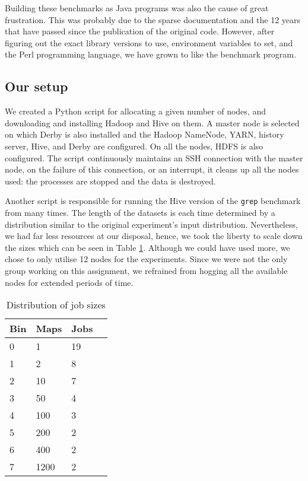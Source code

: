 Building these benchmarks as Java programs was also the cause of great frustration. This was probably due to the sparse documentation and the 12 years that have passed since the publication of the original code. However, after figuring out the exact library versions to use, environment variables to set, and the Perl programming language, we have grown to like the benchmark program.

\subsection{Our setup}

We created a Python script for allocating a given number of nodes, and downloading and installing Hadoop and Hive on them. A master node is selected on which Derby is also installed and the Hadoop NameNode, YARN, history server, Hive, and Derby are configured. On all the nodes, HDFS \cite{borthakur2007hadoop} is also configured. The script continuously maintains an SSH connection with the master node, on the failure of this connection, or an interrupt, it cleans up all the nodes used: the processes are stopped and the data is destroyed.

Another script is responsible for running the Hive version of the \texttt{grep} benchmark from \cite{shao_2009} many times. The length of the datasets is each time determined by a distribution similar to the original experiment's input distribution. Nevertheless, we had far less resources at our disposal, hence, we took the liberty to scale down the sizes which can be seen in Table \ref{tab1}. Although we could have used more, we chose to only utilise 12 nodes for the experiments. Since we were not the only group working on this assignment, we refrained from hogging all the available nodes for extended periods of time.

\begin{table}
\centering
\caption{Distribution of job sizes}\label{tab1}
\begin{tabular}{|l|l|l|l|}
\hline
\textbf{Bin} & \textbf{Maps} & \textbf{Jobs} \\ \hline
0  & 1 & 19       \\ \hline
1  & 2 & 8       \\ \hline
2  & 10 & 7       \\ \hline
3  & 50 & 4       \\ \hline
4  & 100 & 3       \\ \hline
5  & 200 & 2       \\ \hline
6  & 400 & 2       \\ \hline
7  & 1200 & 2       \\ \hline
\end{tabular}
\end{table}


